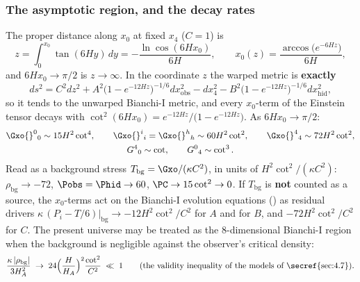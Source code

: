 \subsubsection{The asymptotic region, and the decay rates}
\label{sec:4.3.3}

The proper distance along $x_0$ at fixed $x_4$ ($C=1$) is
\[
  z=\int_0^{x_0}\tan(6Hy)\,dy=-\frac{\ln\cos(6Hx_0)}{6H},\qquad x_0(z)=\frac{\arccos\bigl(e^{-6Hz}\bigr)}{6H},
\]
and $6Hx_0\to\pi/2$ is $z\to\infty$. In the coordinate $z$ the warped metric is \textbf{exactly}
\[
  ds^2=C^2dz^2+A^2\bigl(1-e^{-12Hz}\bigr)^{-1/6}dx_{\mathrm{obs}}^2-dx_4^2-B^2\bigl(1-e^{-12Hz}\bigr)^{-1/6}dx_{\mathrm{hid}}^2 ,
\]
so it tends to the unwarped Bianchi-I metric, and every $x_0$-term of the Einstein tensor decays with
$\cot^2(6Hx_0)=e^{-12Hz}/\bigl(1-e^{-12Hz}\bigr)$. As $6Hx_0\to\pi/2$:
\begin{gather*}
  \Gxo{}^0{}_0\sim15H^2\cot^4,\qquad \Gxo{}^i{}_i=\Gxo{}^h{}_h\sim60H^2\cot^2,\qquad \Gxo{}^4{}_4\sim72H^2\cot^2,\\
  G^4{}_0\sim\cot,\qquad G^0{}_4\sim\cot^3 .
\end{gather*}
Read as a background stress $T_{\mathrm{bg}}=\Gxo/(\kappa C^2)$, in units of $H^2\cot^2/(\kappa C^2)$:
$\rho_{\mathrm{bg}}\to-72$, $\Pobs=\Phid\to60$, $\PC\to15\cot^2\to0$. If $T_{\mathrm{bg}}$ is \textbf{not}
counted as a source, the $x_0$-terms act on the Bianchi-I evolution equations () as
residual drivers $\kappa\,(P_i-T/6)\big|_{\mathrm{bg}}\to-12H^2\cot^2/C^2$ for $A$ and for $B$, and
$-72H^2\cot^2/C^2$ for $C$. The present universe may be treated as the 8-dimensional Bianchi-I region
when the background is negligible against the observer's critical density:
\[
  \frac{\kappa\,|\rho_{\mathrm{bg}}|}{3H_A^2}\;\to\;24\Bigl(\frac{H}{H_A}\Bigr)^2\frac{\cot^2}{C^2}\;\ll\;1
  \qquad\text{(the validity inequality of the models of \secref{sec:4.7})}.
\]
